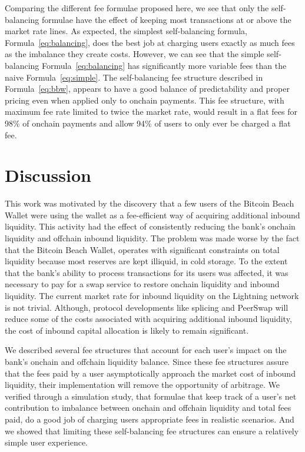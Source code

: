 \documentclass[10pt,twocolumn]{article}
\begin{document}
Comparing the different fee formulae proposed here,
we see that only the self-balancing formulae
have the effect of keeping most transactions
at or above the market rate lines.
As expected,
the simplest self-balancing formula, Formula~\ref{eq:balancing},
does the best job at charging users exactly as much fees
as the imbalance they create costs.
However, we can see that the simple self-balancing
Formula~\ref{eq:balancing}  has significantly more variable fees than
the naive Formula~\ref{eq:simple}.
The self-balancing fee structure
described in Formula~\ref{eq:bbw},
appears to have a good balance of predictability and proper pricing
even when applied only to onchain payments.
This fee structure,
with maximum fee rate limited to twice the market rate,
would result in a flat fees for 98\% of onchain payments and
allow 94\% of users to only ever be charged a flat fee.

\section{Discussion}

This work was motivated by the discovery that
a few users of the Bitcoin Beach Wallet
were using the wallet as a fee-efficient way of
acquiring additional inbound liquidity.
This activity had the effect of consistently reducing the bank's
onchain liquidity and offchain inbound liquidity.
The problem was made worse by the fact that the Bitcoin Beach Wallet,
operates with significant constraints on total liquidity
because most reserves are kept illiquid, in cold storage.
To the extent that the bank's ability to process transactions for its users was affected,
it was necessary to pay for a swap service to
restore onchain liquidity and inbound liquidity.
The current market rate for inbound liquidity on the Lightning network is not trivial.
Although, protocol developments like splicing
and PeerSwap will reduce some of the costs associated with
acquiring additional inbound liquidity,
the cost of inbound capital allocation is likely to remain significant.

We described several fee structures that account for each user's impact
on the bank's onchain and offchain liquidity balance.
Since these fee structures assure that the fees paid by a user
asymptotically approach the market cost of inbound liquidity,
their implementation will remove the opportunity of arbitrage.
We verified through a simulation study,
that formulae that keep track of a user's net
contribution to imbalance between onchain and offchain liquidity
and total fees paid, do a good job of charging users appropriate fees
in realistic scenarios.
And we showed that limiting these self-balancing fee structures
can ensure a relatively simple user experience.
\end{document}
